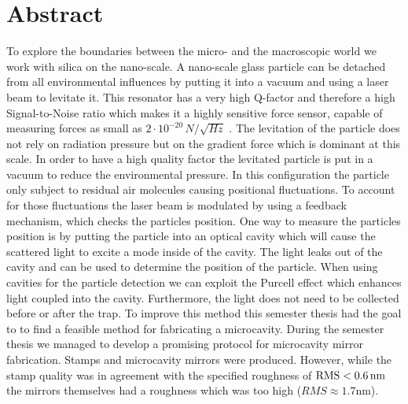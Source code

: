 \section*{Abstract}
To explore the boundaries between the micro- and the macroscopic world we work with silica on the nano-scale. A nano-scale glass particle can be detached from all environmental influences by putting it into a vacuum and using a laser beam to levitate it. This resonator has a very high Q-factor and therefore a high Signal-to-Noise ratio which makes it a highly sensitive force sensor, capable of measuring forces as small as $2\cdot 10^{-20}\,\si{N/\sqrt{Hz}}$ \cite{gieseler2013thermal}. The levitation of the particle does not rely on radiation pressure but on the gradient force which is dominant at this scale. In order to have a high quality factor the levitated particle is put in a vacuum to reduce the environmental pressure. In this configuration the particle only subject to residual air molecules causing positional fluctuations. To account for those fluctuations the laser beam is modulated by using a feedback mechanism, which checks the particles position. One way to measure the particles position is by putting the particle into an optical cavity which will cause the scattered light to excite a mode inside of the cavity. The light leaks out of the cavity and can be used to determine the position of the particle. When using cavities for the particle detection we can exploit the Purcell effect which enhances light coupled into the cavity. Furthermore, the light does not need to be collected before or after the trap. To improve this method this semester thesis had the goal to to find a feasible method for fabricating a microcavity. During the semester thesis we managed to develop a promising protocol for microcavity mirror fabrication. Stamps and microcavity mirrors were produced. However, while the stamp quality was in agreement with the specified roughness of $\si{RMS}<0.6\nm$ the mirrors themselves had a roughness which was too high ($\si{RMS\approx 1.7\nm}$). 
